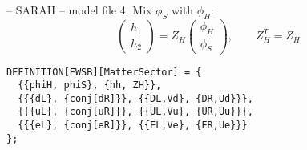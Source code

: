 \documentclass[11pt]{beamer}
\begin{document}

\begin{frame}[fragile]{\insertsection -- SARAH -- model file}
  4. Mix $\phi_S$ with $\phi_H$:
  \begin{equation*}
    \begin{pmatrix}
      h_1 \\ h_2
    \end{pmatrix}
    =
    Z_H
    \begin{pmatrix}
      \phi_H \\ \phi_S
    \end{pmatrix},
    \qquad
    Z_H^T = Z_H
  \end{equation*}
  \begin{lstlisting}
DEFINITION[EWSB][MatterSector] = {
  {{phiH, phiS}, {hh, ZH}},
  {{{dL}, {conj[dR]}}, {{DL,Vd}, {DR,Ud}}},
  {{{uL}, {conj[uR]}}, {{UL,Vu}, {UR,Uu}}},
  {{{eL}, {conj[eR]}}, {{EL,Ve}, {ER,Ue}}}
};\end{lstlisting}
\end{frame}


\end{document}

